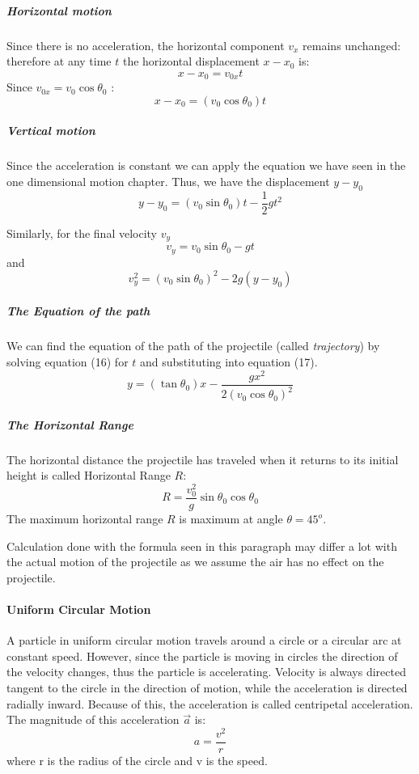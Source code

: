\documentclass{scrartcl}
\begin{document}
    \subparagraph{Horizontal motion} Since there is no acceleration, the horizontal component $v_x$ remains unchanged: therefore at any time $t$ the horizontal displacement $x - x_0$ is:
    \begin{equation}
        x - x_0 = v_{0x}t
    \end{equation}
    Since $v_{0x} = v_0 \cos \theta_0$ : 
    \begin{equation}
        x - x_0 = (v_0 \cos \theta_0)t
    \end{equation}
    
    \subparagraph{Vertical motion} Since the acceleration is constant we can apply the equation we have seen in the one dimensional motion chapter. Thus, we have the displacement $y- y_0$
    \begin{equation}
        y - y_0 = (v_{0} \sin \theta_0)t - \frac{1}{2}gt^2
    \end{equation}
    
    Similarly, for the final velocity $v_y$
    \begin{equation}
        v_y = v_0 \sin \theta_0 - gt 
    \end{equation}
    and
    \begin{equation}
        v^2_y = (v_0 \sin \theta_0)^2 - 2g(y-y_0)
    \end{equation}
    \subparagraph{The Equation of the path} We can find the equation of the path of the projectile (called \emph{trajectory}) by solving equation (16) for $t$ and substituting into equation (17).
    \begin{equation}
        y = (\tan \theta_0)x - \frac{gx^2}{2(v_0 \cos \theta_0)^2}
    \end{equation}
    \subparagraph{The Horizontal Range} The horizontal distance the projectile has traveled when it returns to its initial height is called Horizontal Range $R$:
    \begin{equation}
        R = \frac{v^2_0}{g} \sin \theta_0 \cos \theta_0
    \end{equation}
    The maximum horizontal range $R$ is maximum at angle $\theta = 45^o$.
    
    Calculation done with the formula seen in this paragraph may differ a lot with the actual motion of the projectile as we assume the air has no effect on the projectile. 
    
    \paragraph{Uniform Circular Motion} A particle in uniform circular motion travels around a circle or a circular arc at constant speed. However, since the particle is moving in circles the direction of the velocity changes, thus the particle is accelerating. Velocity is always directed tangent to the circle in the direction of motion, while the acceleration is directed radially inward. Because of this, the acceleration is called centripetal acceleration. The magnitude of this acceleration $\vec{a}$ is:
    \begin{equation}
        a = \frac{v^2}{r}
    \end{equation}
    where r is the radius of the circle and v is the speed.
    
\end{document}

